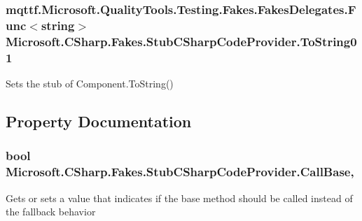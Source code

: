\hypertarget{class_microsoft_1_1_c_sharp_1_1_fakes_1_1_stub_c_sharp_code_provider_a9cd137ecdf9e60adc3ec3d30d9279243}{
\subsubsection[{To\-String01}]{\setlength{\rightskip}{0pt plus 5cm}mqttf.\-Microsoft.\-Quality\-Tools.\-Testing.\-Fakes.\-Fakes\-Delegates.\-Func$<$string$>$ Microsoft.\-C\-Sharp.\-Fakes.\-Stub\-C\-Sharp\-Code\-Provider.\-To\-String01}}\label{class_microsoft_1_1_c_sharp_1_1_fakes_1_1_stub_c_sharp_code_provider_a9cd137ecdf9e60adc3ec3d30d9279243}


Sets the stub of Component.\-To\-String()



\subsection{Property Documentation}
\hypertarget{class_microsoft_1_1_c_sharp_1_1_fakes_1_1_stub_c_sharp_code_provider_ace9eb4a704a7dc623d1f21f57812c7f7}{
\subsubsection[{Call\-Base}]{\setlength{\rightskip}{0pt plus 5cm}bool Microsoft.\-C\-Sharp.\-Fakes.\-Stub\-C\-Sharp\-Code\-Provider.\-Call\-Base\hspace{0.3cm}{\ttfamily [get]}, {\ttfamily [set]}}}\label{class_microsoft_1_1_c_sharp_1_1_fakes_1_1_stub_c_sharp_code_provider_ace9eb4a704a7dc623d1f21f57812c7f7}


Gets or sets a value that indicates if the base method should be called instead of the fallback behavior

